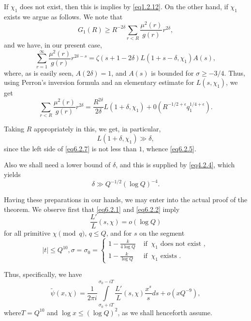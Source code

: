 If $\chi_1$ does not exist, then this is implies by \eqref{eq1.2.12}. On the
other hand, if $\chi_1$ exists we argue as follows. We note that 
$$
G_1(R) \geq R^{-2\delta} \sum_{r < R} \frac{\mu^2(r)}{g(r)} r^{2\delta},
$$
and we have, in our present case, 
$$
\sum_{r=1}^{\infty}\frac{\mu^2(r)}{g(r)} r^{2\delta-s} =
\zeta(s+1-2\delta)L(1+s-\delta,\chi_1)A(s), 
$$
where, as is easily seen, $A(2\delta) = 1$, and $A(s)$ is bounded for
$\sigma \geq -3/4$. Thus, using Perron's inversion formula and an
elementary estimate for $L(s,\chi_1)$, we get 
\begin{equation*}
  \sum_{r<R}\frac{\mu^2(r)}{g(r)}r^{2\delta} =
  \frac{R^{2\delta}}{2\delta}
  L(1+\delta,\chi_1)+0(R^{-1/2+\epsilon}
  q_1^{1/4+\epsilon }).\tag{6.2.7} \label{eq6.2.7}
\end{equation*}\pageoriginale

Taking $R$ appropriately in this, we get, in particular,
\begin{equation*}
  L(1+\delta,\chi_1) \gg \delta,\tag{6.2.8}\label{eq6.2.8}
\end{equation*}
since the left side of \eqref{eq6.2.7} is not less than $1$, whence
\eqref{eq6.2.5}. 

Also we shall need a lower bound of $\delta$, and this is supplied by
\eqref{eq4.2.4}, which yields 
\begin{equation*}
  \delta \gg Q^{-1/2} (\log Q)^{-4}.\tag{6.2.9}\label{eq6.2.9}
\end{equation*}

Having these preparations in our hands, we may enter into the actual
proof of the theorem. We observe first that \eqref{eq6.2.1} and
\eqref{eq6.2.2} imply  
\begin{equation*}
  \frac{L'}{L}(s,\chi ) = o(\log Q)\tag{6.2.10}\label{eq6.2.10}
\end{equation*}
for all primitive $\chi \pmod{q}$, $q\leq Q$, and for $s$ on the segment
\begin{equation*}
  |t| \leq Q^{10},\sigma = \sigma_0 =
  \begin{cases}
    1 - \frac{k}{4\log Q} & \text{ if }~ \chi_1 \text{ does not exist },\\
    1 - \frac{k}{\log Q} & \text{ if }~ \chi_1 \text{ exists }.
  \end{cases}
\end{equation*}

Thus, specifically, we have
\begin{equation*}
  \tilde{\psi}(x,\chi ) = \frac{1}{2 \pi i} \int\limits_{\sigma_0 +
    iT}^{\sigma_0 - iT} \frac{L'}{L}(s,\chi ) \frac{x^s}{s} ds +
  o(xQ^{-9}),\tag{6.2.11} \label{eq6.2.11}
\end{equation*}
where\pageoriginale $T = Q^{10}$ and $\log x \leq (\log Q)^2$, as we
shall henceforth assume. 

